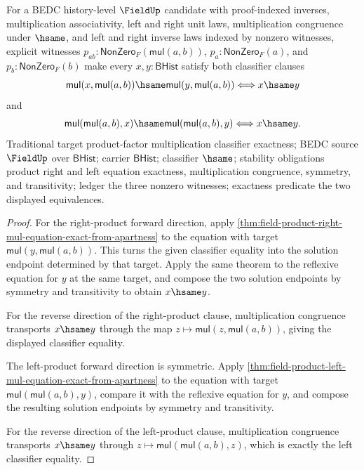\begin{theorem}
\label{thm:field-product-factor-map-classifier-exact-from-apartness}
For a BEDC history-level $\FieldUp$ candidate with proof-indexed inverses,
multiplication associativity, left and right unit laws, multiplication
congruence under $\hsame$, and left and right inverse laws indexed by nonzero
witnesses, explicit witnesses
$p_{ab}:\mathsf{NonZero}_F(\mathsf{mul}(a,b))$,
$p_a:\mathsf{NonZero}_F(a)$, and $p_b:\mathsf{NonZero}_F(b)$ make every
$x,y:\mathsf{BHist}$ satisfy both classifier clauses
$$
\mathsf{mul}(x,\mathsf{mul}(a,b))\hsame
\mathsf{mul}(y,\mathsf{mul}(a,b))
\Longleftrightarrow
x\hsame y
$$
and
$$
\mathsf{mul}(\mathsf{mul}(a,b),x)\hsame
\mathsf{mul}(\mathsf{mul}(a,b),y)
\Longleftrightarrow
x\hsame y.
$$
Traditional target product-factor multiplication classifier exactness; BEDC
source $\FieldUp$ over $\mathsf{BHist}$; carrier $\mathsf{BHist}$; classifier
$\hsame$; stability obligations product right and left equation exactness,
multiplication congruence, symmetry, and transitivity; ledger the three
nonzero witnesses; exactness predicate the two displayed equivalences.
\end{theorem}
\begin{proof}
For the right-product forward direction, apply
\autoref{thm:field-product-right-mul-equation-exact-from-apartness} to the
equation with target $\mathsf{mul}(y,\mathsf{mul}(a,b))$. This turns the
given classifier equality into the solution endpoint determined by that
target. Apply the same theorem to the reflexive equation for $y$ at the same
target, and compose the two solution endpoints by symmetry and transitivity
to obtain $x\hsame y$.

For the reverse direction of the right-product clause, multiplication
congruence transports $x\hsame y$ through the map
$z\mapsto\mathsf{mul}(z,\mathsf{mul}(a,b))$, giving the displayed classifier
equality.

The left-product forward direction is symmetric. Apply
\autoref{thm:field-product-left-mul-equation-exact-from-apartness} to the
equation with target $\mathsf{mul}(\mathsf{mul}(a,b),y)$, compare it with the
reflexive equation for $y$, and compose the resulting solution endpoints by
symmetry and transitivity.

For the reverse direction of the left-product clause, multiplication
congruence transports $x\hsame y$ through
$z\mapsto\mathsf{mul}(\mathsf{mul}(a,b),z)$, which is exactly the left
classifier equality.
\end{proof}

